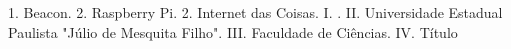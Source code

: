 \documentclass[
	12pt,				%
	openright,			%
	oneside,			%
	a4paper,			%
	chapter=TITLE,		%
	english,			%
	french,				%
	spanish,			%
	brazil				%
	]{abntex2}
\begin{document}
{\begin{fichacatalografica}
\begin{center}
{\begin{minipage}[c][8cm]{13.5cm}
	\hspace{0.5cm}
		1. Beacon.
		2. Raspberry Pi.
		2. Internet das Coisas.
		I. \imprimirorientador.
		II. Universidade Estadual Paulista "Júlio de Mesquita Filho".
		III. Faculdade de Ciências.
		IV. Título
	\end{minipage}}
	\end{center}
  \end{fichacatalografica}
\fi







%
% 
%
\begin{folhadeaprovacao}
  \ABNTEXchapterfont {

    \begin{center}
    
      {\ImprimirAutor}

      \vspace*{\fill}\vspace*{\fill}
      

\end{center}}
\end{folhadeaprovacao}}
\end{document}
